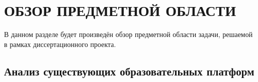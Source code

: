 \section{ОБЗОР ПРЕДМЕТНОЙ ОБЛАСТИ}

В данном разделе будет произведён обзор предметной области задачи, решаемой в рамках диссертационного проекта.

\subsection{Анализ существующих образовательных платформ}

\newpage
